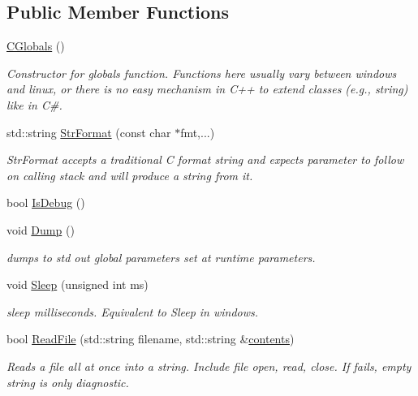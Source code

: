 \subsection*{Public Member Functions}
\begin{DoxyCompactItemize}
\item 
\hyperlink{classCGlobals_a5b9dfa617380bb74856a39f519445fc5}{C\-Globals} ()
\begin{DoxyCompactList}\small\item\em Constructor for globals function. Functions here usually vary between windows and linux, or there is no easy mechanism in C++ to extend classes (e.\-g., string) like in C\#. \end{DoxyCompactList}\item 
std\-::string \hyperlink{classCGlobals_ab08bfe830833f153fcd15e1eadb05287}{Str\-Format} (const char $\ast$fmt,...)
\begin{DoxyCompactList}\small\item\em Str\-Format accepts a traditional C format string and expects parameter to follow on calling stack and will produce a string from it. \end{DoxyCompactList}\item 
bool \hyperlink{classCGlobals_a7df69244ed592e7291bf9608fa54bfac}{Is\-Debug} ()
\item 
void \hyperlink{classCGlobals_af14ced4c6f3b924d134894651f1afce0}{Dump} ()
\begin{DoxyCompactList}\small\item\em dumps to std out global parameters set at runtime parameters. \end{DoxyCompactList}\item 
void \hyperlink{classCGlobals_a5d120cec7b57ee16fca7fc9398c67d61}{Sleep} (unsigned int ms)
\begin{DoxyCompactList}\small\item\em sleep milliseconds. Equivalent to Sleep in windows. \end{DoxyCompactList}\item 
bool \hyperlink{classCGlobals_ac1722817e9b2e73b2daa73ef40179cef}{Read\-File} (std\-::string filename, std\-::string \&\hyperlink{SanityCheckTests_8cpp_aed76f8804515a6923e39ee3257c3fb52}{contents})
\begin{DoxyCompactList}\small\item\em Reads a file all at once into a string. Include file open, read, close. If fails, empty string is only diagnostic. \end{DoxyCompactList}\item 

\end{DoxyCompactItemize}
